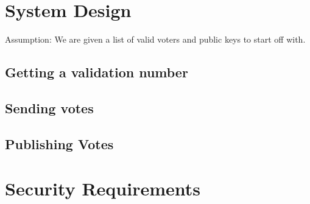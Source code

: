 \documentclass{article}
\begin{document}
\section{System Design}

Assumption: We are given a list of valid voters and public keys to start off with.

\subsection{Getting a validation number}

\subsection{Sending votes}

\subsection{Publishing Votes}

\section{Security Requirements}
\end{document}
